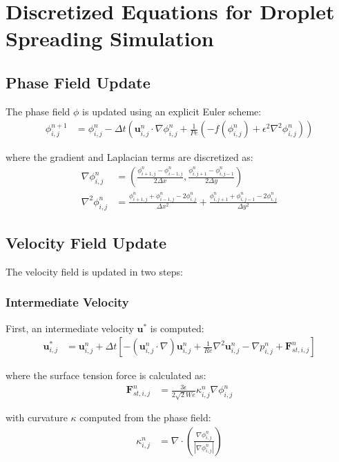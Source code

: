 \documentclass{article}
\begin{document}
\section{Discretized Equations for Droplet Spreading Simulation}

\subsection{Phase Field Update}
The phase field $\phi$ is updated using an explicit Euler scheme:
\begin{align}
\phi^{n+1}_{i,j} &= \phi^n_{i,j} - \Delta t \left( \mathbf{u}^n_{i,j} \cdot \nabla \phi^n_{i,j} + \frac{1}{Pe}\left(-f(\phi^n_{i,j}) + \epsilon^2 \nabla^2 \phi^n_{i,j}\right) \right)
\end{align}

where the gradient and Laplacian terms are discretized as:
\begin{align}
\nabla \phi^n_{i,j} &= \left( \frac{\phi^n_{i+1,j} - \phi^n_{i-1,j}}{2\Delta x}, \frac{\phi^n_{i,j+1} - \phi^n_{i,j-1}}{2\Delta y} \right) \\
\nabla^2 \phi^n_{i,j} &= \frac{\phi^n_{i+1,j} + \phi^n_{i-1,j} - 2\phi^n_{i,j}}{\Delta x^2} + \frac{\phi^n_{i,j+1} + \phi^n_{i,j-1} - 2\phi^n_{i,j}}{\Delta y^2}
\end{align}

\subsection{Velocity Field Update}
The velocity field is updated in two steps:

\subsubsection{Intermediate Velocity}
First, an intermediate velocity $\mathbf{u}^*$ is computed:
\begin{align}
\mathbf{u}^*_{i,j} &= \mathbf{u}^n_{i,j} + \Delta t \left[ -(\mathbf{u}^n_{i,j} \cdot \nabla)\mathbf{u}^n_{i,j} + \frac{1}{Re}\nabla^2\mathbf{u}^n_{i,j} - \nabla p^n_{i,j} + \mathbf{F}_{st,i,j}^n \right]
\end{align}

where the surface tension force is calculated as:
\begin{align}
\mathbf{F}_{st,i,j}^n &= \frac{3\epsilon}{2\sqrt{2}We}\kappa^n_{i,j}\nabla\phi^n_{i,j}
\end{align}

with curvature $\kappa$ computed from the phase field:
\begin{align}
\kappa^n_{i,j} &= \nabla \cdot \left( \frac{\nabla\phi^n_{i,j}}{|\nabla\phi^n_{i,j}|} \right)
\end{align}
\end{document}
